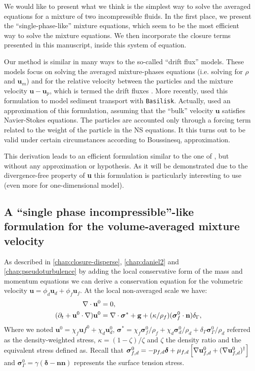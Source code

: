 We would like to present what we think is the simplest way to solve the averaged equations for a mixture of two incompressible fluids.
In the first place, we present the ``single-phase-like'' mixture equations, which seem to be the most efficient way to solve the mixture equations. 
We then incorporate the closure terms presented in this manuscript, inside this system of equation.

Our method is similar in many ways to the so-called ``drift flux'' models. 
These models focus on solving the averaged mixture-phases equations (i.e. solving for $\rho$ and $\textbf{u}_m$) and for the relative velocity between the particles and the mixture velocity $\textbf{u}- \textbf{u}_p$, which is termed the drift fluxes \citep{ishii1977one,guazzelli2011}.  
More recently,  \citet{kriaa2023two} used this formulation to model sediment transport with \texttt{Basilisk}.
Actually, \citet{kriaa2023two} used an approximation of this formulation, assuming that the ``bulk'' velocity $\textbf{u}$ satisfies Navier-Stokes equations.
The particles are accounted  only through a forcing term related to the weight of the particle in the NS equations. 
It this turns out to be valid under certain circumstances  according to Boussinesq, approximation. 

This derivation leads to an efficient formulation similar to the one of \citet{kriaa2023two}, but without any approximation or hypothesis.  
As it will be demonstrated due to the divergence-free property of \textbf{u} this formulation is particularly interesting to use (even more for one-dimensional model). 



\subsection{A ``single phase incompressible''-like formulation for the volume-averaged mixture velocity}

As described in \ref{chap:closure-disperse}, \ref{chap:daniel2} and \ref{chap:pseudoturbulence} by adding the local conservative form of the mass and momentum equations we can derive a conservation equation for the volumetric velocity $\textbf{u} =\phi_d\textbf{u}_d + \phi_f \textbf{u}_f$. 
At the local non-averaged scale we have: 
\begin{align}
    \label{eq:NSmass0}
    \div \textbf{u}^0 &= 0, \\
    (\pddt 
    + \textbf{u}^0 \cdot \grad) \textbf{u}^0
    &= 
    \div \bm\sigma^*
    +\textbf{g}
    +(\kappa/\rho_f)(\bm\sigma_f^0\cdot \textbf{n})\delta_\Gamma,
    \label{eq:NSmomentum0}
\end{align}
Where we noted $\textbf{u}^0 = \chi_f \textbf{u}f^0 + \chi_d \textbf{u}_d^0$, $\bm\sigma^* = \chi_f \bm\sigma_f^0/\rho_f  + \chi_d \bm\sigma_d^0/\rho_d + \delta_\Gamma \bm\sigma_\Gamma^0/\rho_d $ referred as the density-weighted stress, $\kappa = (1-\zeta)/\zeta$ and $\zeta$ the density ratio and the equivalent stress defined as.
Recall that $\bm\sigma_{f,d}^0 = -p_{f,d}\bm\delta + \mu_{f,d}\left[\mathbf{\nabla} \textbf{u}_{f,d}^0+ (\mathbf{\nabla} \textbf{u}_{f,d}^0)^\dagger\right]$ and $\bm\sigma_\Gamma^0 = \gamma (\bm\delta - \textbf{nn})$ represents the surface tension stress.

